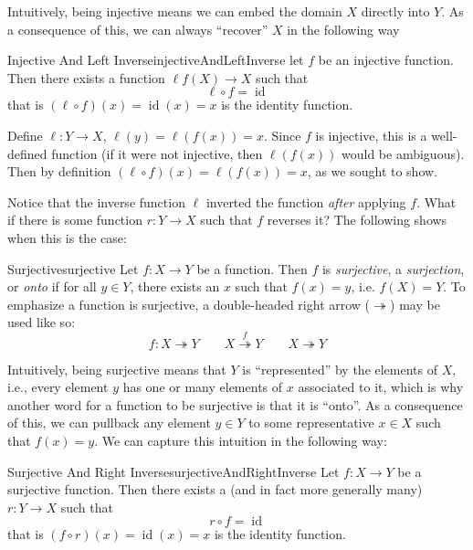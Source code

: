 \documentclass{book}
\newcommand{\id}{{\operatorname{id}}}
\newcommand{\rw}{\rightarrow}
\begin{document}
Intuitively, being injective means we can embed the domain $X$ directly into $Y$. As a consequence of this, we can
always ``recover'' $X$ in the following way

\begin{prop}{Injective And Left Inverse}{injectiveAndLeftInverse}
	let $f$ be an injective function. Then there exists a function $\ell f(X) \rw X$ such that
	\[
		\ell\circ f = \id
	\]
	that is $(\ell\circ f)(x) = \id(x) = x$ is the identity function.
\end{prop}

\begin{Proof}
	Define $\ell: Y \rw X$, $\ell(y) = \ell(f(x)) = x$. Since $f$ is injective, this is a well-defined
	function (if it were not injective, then $\ell(f(x))$ would be ambiguous). Then by definition $(\ell\circ
	f)(x) = \ell(f(x)) = x$, as we sought to show.
\end{Proof}

Notice that the inverse function $\ell$ inverted the function \emph{after} applying $f$. What if there is some
function $r: Y \to X$ such that $f$ reverses it? The following shows when this is the case:

\begin{defn}{Surjective}{surjective}
	Let $f: X \rw Y$ be a function. Then $f$ is \emph{surjective}, a \emph{surjection}, or \emph{onto} if for all $y \in Y$,
	there exists an $x$ such that $f(x) = y$, i.e. $f(X) = Y$. To emphasize a function is surjective,
	a double-headed right arrow ($\twoheadrightarrow$) may be used like so:
	\[
		f: X \twoheadrightarrow Y \qquad X \overset{f}{\twoheadrightarrow} Y \qquad X\twoheadrightarrow Y
	\]
\end{defn}

Intuitively, being surjective means that $Y$ is ``represented'' by the elements of $X$, i.e., every element
$y$ has one or many elements of $x$ associated to it, which is why another word for a function to be
surjective is that it is ``onto''. As a consequence of this, we can pullback any element $y \in Y$ to some
representative $x \in X$ such that $f(x) = y$. We can capture this intuition in the following way:

\begin{prop}{Surjective And Right Inverse}{surjectiveAndRightInverse}
	Let $f: X \rw Y$ be a surjective function. Then there exists a (and in fact more generally many) $r: Y \rw
	X$ such that
	\[
		r \circ f = \id
	\]
	that is $(f\circ r)(x) = \id(x) = x$ is the identity function.
\end{prop}
\end{document}
